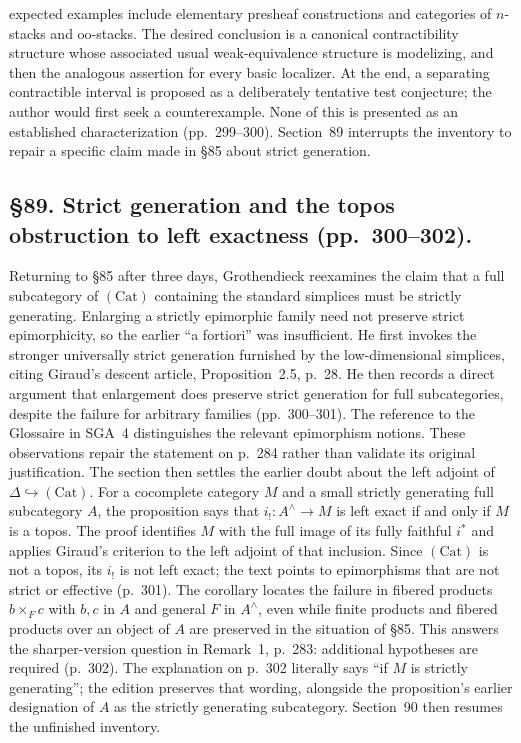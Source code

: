 \documentclass[10pt,oneside]{book}
\begin{document}
expected examples include elementary presheaf constructions and categories of $n$-stacks and $\mathrm{oo}$-stacks. The desired conclusion is a canonical contractibility structure whose associated usual weak-equivalence structure is modelizing, and then the analogous assertion for every basic localizer. At the end, a separating contractible interval is proposed as a deliberately tentative test conjecture; the author would first seek a counterexample. None of this is presented as an established characterization (pp.\ 299--300). Section~89 interrupts the inventory to repair a specific claim made in \S85 about strict generation.

\subsection*{\S89. Strict generation and the topos obstruction to left exactness (pp.\ 300--302).}
Returning to \S85 after three days, Grothendieck reexamines the claim that a full subcategory of $(\mathrm{Cat})$ containing the standard simplices must be strictly generating. Enlarging a strictly epimorphic family need not preserve strict epimorphicity, so the earlier “a fortiori” was insufficient. He first invokes the stronger universally strict generation furnished by the low-dimensional simplices, citing Giraud's descent article, Proposition~2.5, p.\ 28. He then records a direct argument that enlargement does preserve strict generation for full subcategories, despite the failure for arbitrary families (pp.\ 300--301). The reference to the Glossaire in SGA~4 distinguishes the relevant epimorphism notions. These observations repair the statement on p.\ 284 rather than validate its original justification.
The section then settles the earlier doubt about the left adjoint of $\Delta\hookrightarrow(\mathrm{Cat})$. For a cocomplete category $M$ and a small strictly generating full subcategory $A$, the proposition says that $i_!:A^\wedge\to M$ is left exact if and only if $M$ is a topos. The proof identifies $M$ with the full image of its fully faithful $i^*$ and applies Giraud's criterion to the left adjoint of that inclusion. Since $(\mathrm{Cat})$ is not a topos, its $i_!$ is not left exact; the text points to epimorphisms that are not strict or effective (p.\ 301). The corollary locates the failure in fibered products $b\times_F c$ with $b,c$ in $A$ and general $F$ in $A^\wedge$, even while finite products and fibered products over an object of $A$ are preserved in the situation of \S85. This answers the sharper-version question in Remark~1, p.\ 283: additional hypotheses are required (p.\ 302). The explanation on p.\ 302 literally says “if $M$ is strictly generating”; the edition preserves that wording, alongside the proposition's earlier designation of $A$ as the strictly generating subcategory. Section~90 then resumes the unfinished inventory.
\end{document}

